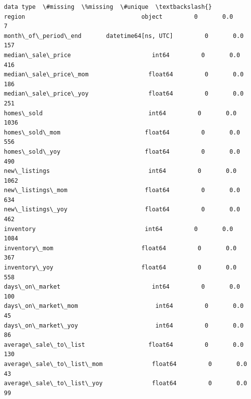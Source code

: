 \documentclass[11pt]{article}
\makeatletter
\newcommand{\boxspacing}{\kern\kvtcb@left@rule\kern\kvtcb@boxsep}
\newcommand{\prompt}[4]{
        {\ttfamily\llap{{\color{#2}[#3]:\hspace{3pt}#4}}\vspace{-\baselineskip}}
    }
\makeatother
\begin{document}
            \begin{tcolorbox}[breakable, size=fbox, boxrule=.5pt, pad at break*=1mm, opacityfill=0]
\prompt{Out}{outcolor}{4}{\boxspacing}
\begin{Verbatim}[commandchars=\\\{\}]
                                    data type  \#missing  \%missing  \#unique  \textbackslash{}
region                                 object         0       0.0        7
month\_of\_period\_end       datetime64[ns, UTC]         0       0.0      157
median\_sale\_price                       int64         0       0.0      416
median\_sale\_price\_mom                 float64         0       0.0      186
median\_sale\_price\_yoy                 float64         0       0.0      251
homes\_sold                              int64         0       0.0     1036
homes\_sold\_mom                        float64         0       0.0      556
homes\_sold\_yoy                        float64         0       0.0      490
new\_listings                            int64         0       0.0     1062
new\_listings\_mom                      float64         0       0.0      634
new\_listings\_yoy                      float64         0       0.0      462
inventory                               int64         0       0.0     1084
inventory\_mom                         float64         0       0.0      367
inventory\_yoy                         float64         0       0.0      558
days\_on\_market                          int64         0       0.0      100
days\_on\_market\_mom                      int64         0       0.0       45
days\_on\_market\_yoy                      int64         0       0.0       86
average\_sale\_to\_list                  float64         0       0.0      130
average\_sale\_to\_list\_mom              float64         0       0.0       43
average\_sale\_to\_list\_yoy              float64         0       0.0       99


\end{Verbatim}
\end{tcolorbox}
\end{document}
